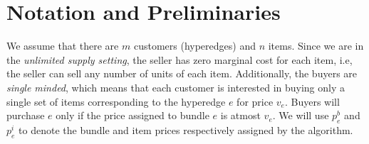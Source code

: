 
\section{Notation and Preliminaries}

We assume that there are $m$ customers (hyperedges) and $n$ items. Since we are in the {\em unlimited supply setting}, the seller has zero marginal cost  for each item, i.e, the seller can sell any number of units of each item. Additionally, the buyers are  {\em single minded}, which means that each customer is interested in buying only a single set of items corresponding to the hyperedge $e$ for price $v_e$. Buyers will purchase $e$ only if the price assigned to bundle $e$ is atmost $v_e$. We will use $p^{b}_e$ and $p^{i}_e$ to denote the bundle and item prices respectively assigned by the algorithm. 